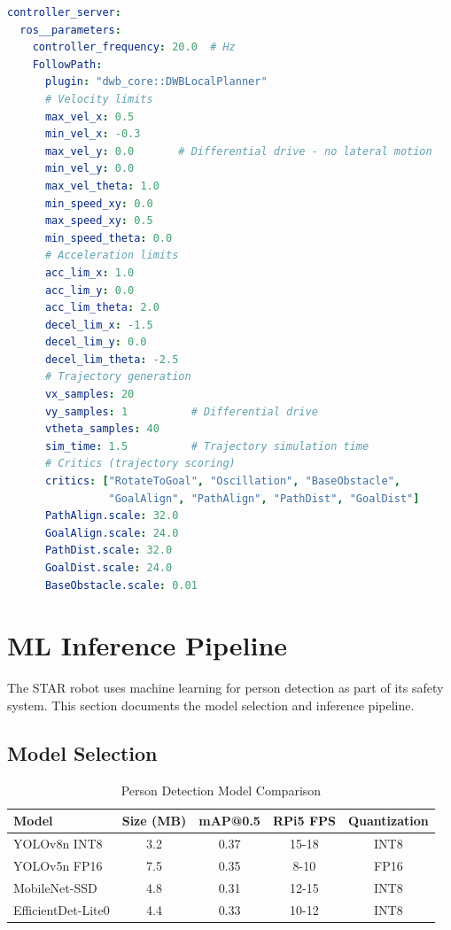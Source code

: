 \documentclass[11pt,letterpaper]{article}
\begin{document}
\begin{lstlisting}[language=yaml, caption=nav2\_params.yaml (DWA section)]
controller_server:
  ros__parameters:
    controller_frequency: 20.0  # Hz
    FollowPath:
      plugin: "dwb_core::DWBLocalPlanner"
      # Velocity limits
      max_vel_x: 0.5
      min_vel_x: -0.3
      max_vel_y: 0.0       # Differential drive - no lateral motion
      min_vel_y: 0.0
      max_vel_theta: 1.0
      min_speed_xy: 0.0
      max_speed_xy: 0.5
      min_speed_theta: 0.0
      # Acceleration limits
      acc_lim_x: 1.0
      acc_lim_y: 0.0
      acc_lim_theta: 2.0
      decel_lim_x: -1.5
      decel_lim_y: 0.0
      decel_lim_theta: -2.5
      # Trajectory generation
      vx_samples: 20
      vy_samples: 1          # Differential drive
      vtheta_samples: 40
      sim_time: 1.5          # Trajectory simulation time
      # Critics (trajectory scoring)
      critics: ["RotateToGoal", "Oscillation", "BaseObstacle",
                "GoalAlign", "PathAlign", "PathDist", "GoalDist"]
      PathAlign.scale: 32.0
      GoalAlign.scale: 24.0
      PathDist.scale: 32.0
      GoalDist.scale: 24.0
      BaseObstacle.scale: 0.01
\end{lstlisting}

\section{ML Inference Pipeline}

The STAR robot uses machine learning for person detection as part of its safety system. This section documents the model selection and inference pipeline.

\subsection{Model Selection}

\begin{table}[H]
\centering
\caption{Person Detection Model Comparison}
\begin{tabular}{|l|c|c|c|c|}
\hline
\textbf{Model} & \textbf{Size (MB)} & \textbf{mAP@0.5} & \textbf{RPi5 FPS} & \textbf{Quantization} \\
\hline
YOLOv8n INT8 & 3.2 & 0.37 & 15-18 & INT8 \\
\hline
YOLOv5n FP16 & 7.5 & 0.35 & 8-10 & FP16 \\
\hline
MobileNet-SSD & 4.8 & 0.31 & 12-15 & INT8 \\
\hline
EfficientDet-Lite0 & 4.4 & 0.33 & 10-12 & INT8 \\
\hline
\end{tabular}
\end{table}
\end{document}
